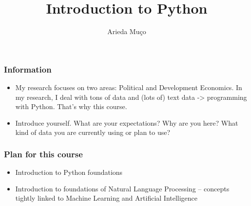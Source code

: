 \documentclass[compress, aspectratio=54]{beamer}
\title[Introduction]{Introduction to Python}
\author[Arieda Mu\c co]{Arieda Mu\c co}
\institute[CEU]{Central European University}
\date{}
\begin{document}
\captionsetup[subfigure]{labelformat=empty}

\frame{\titlepage}



\begin{frame}
\frametitle{Information}
\begin{itemize}
\item My research focuses on two areas: Political and Development Economics. In my research, I deal with tons of data and (lots of) text data -> programming with Python. That's why this course.
\item Introduce yourself. What are your expectations? Why are you here? What kind of data you are currently using or plan to use? 
\end{itemize}
\end{frame}

\begin{frame}
\frametitle{Plan for this course}
\begin{itemize}
\item Introduction to Python foundations
\item Introduction to  foundations of Natural Language Processing -- concepts tightly linked to Machine Learning and Artificial Intelligence

\end{itemize}
\end{frame}






\end{document}
